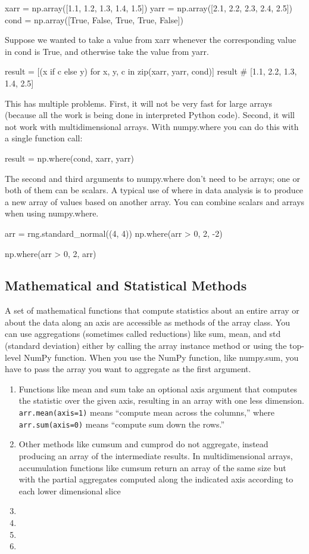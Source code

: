 \begin{pyc}
xarr = np.array([1.1, 1.2, 1.3, 1.4, 1.5])
yarr = np.array([2.1, 2.2, 2.3, 2.4, 2.5])
cond = np.array([True, False, True, True, False])
\end{pyc}
Suppose we wanted to take a value from xarr whenever the corresponding value in cond is True, and otherwise take the value from yarr.
\begin{pyc}
result = [(x if c else y) for x, y, c in zip(xarr, yarr, cond)]
result
# [1.1, 2.2, 1.3, 1.4, 2.5]
\end{pyc}

This has multiple problems. First, it will not be very fast for large arrays (because all the work is being done in interpreted Python code). Second, it will not work with multidimensional arrays. With numpy.where you can do this with a single function call:
\begin{pyc}
result = np.where(cond, xarr, yarr)
\end{pyc}

The second and third arguments to numpy.where don't need to be arrays; one or both of them can be scalars. A typical use of where in data analysis is to produce a new array of values based on another array. You can combine scalars and arrays when using numpy.where. 
\begin{pyc}
arr = rng.standard_normal((4, 4))
np.where(arr > 0, 2, -2)

np.where(arr > 0, 2, arr)
\end{pyc}

\subsection{Mathematical and Statistical Methods}
A set of mathematical functions that compute statistics about an entire array or about the data along an axis are accessible as methods of the array class. You can use aggregations (sometimes called reductions) like sum, mean, and std (standard deviation) either by calling the array instance method or using the top-level NumPy function. When you use the NumPy function, like numpy.sum, you have to pass the array you want to aggregate as the first argument.

\begin{enumerate}
    \item Functions like mean and sum take an optional axis argument that computes the statistic over the given axis, resulting in an array with one less dimension. \verb|arr.mean(axis=1)| means “compute mean across the columns,” where \verb|arr.sum(axis=0)| means “compute sum down the rows.” 
    \item Other methods like cumsum and cumprod do not aggregate, instead producing an array of the intermediate results. In multidimensional arrays, accumulation functions like cumsum return an array of the same size but with the partial aggregates computed along the indicated axis according to each lower dimensional slice
    \item 
    \item 
    \item 
    \item 
\end{enumerate}
